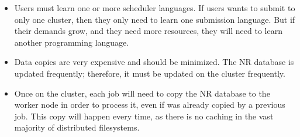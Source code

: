 \begin{itemize}
	\item Users must learn one or more scheduler languages.  If users wants to submit to only one cluster, then they only need to learn one submission language.  But if their demands grow, and they need more resources, they will need to learn another programming language.
	\item Data copies are very expensive and should be minimized.  The NR database is updated frequently;  therefore, it must be updated on the cluster frequently.
	\item Once on the cluster, each job will need to copy the NR database to the worker node in order to process it, even if was already copied by a previous job.  This copy will happen every time, as there is no caching in the vast majority of distributed filesystems.
\end{itemize}








